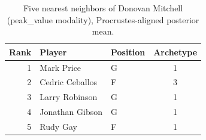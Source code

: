 \begin{table}[htbp]
  \centering\small
  \begin{tabular}{rllc}
    \toprule
    Rank & Player & Position & Archetype \\
    \midrule
    1 & Mark Price & G & 1 \\
    2 & Cedric Ceballos & F & 3 \\
    3 & Larry Robinson & G & 1 \\
    4 & Jonathan Gibson & G & 1 \\
    5 & Rudy Gay & F & 1 \\
    \bottomrule
  \end{tabular}
  \caption{Five nearest neighbors of Donovan Mitchell (peak_value modality), Procrustes-aligned posterior mean.}
  \label{tab:Donovan_Mitchell_neighbors_peak_value}
\end{table}

